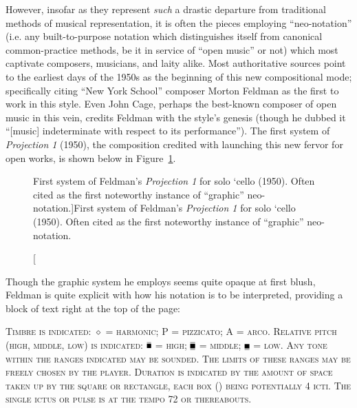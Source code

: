     However, insofar as they represent \textit{such} a drastic departure from traditional methods of musical representation, it is often the pieces employing ``neo-notation'' (i.e. any built-to-purpose notation which distinguishes itself from canonical common-practice methods, be it in service of ``open music'' or not) which most captivate composers, musicians, and laity alike. Most authoritative sources point to the earliest days of the 1950s as the beginning of this new compositional mode; specifically citing ``New York School'' composer Morton Feldman as the first to work in this style. Even John Cage, perhaps the best-known composer of open music in this vein, credits Feldman with the style's genesis (though he dubbed it ``[music] indeterminate with respect to its performance'').\autocite{Dohoney_2017} The first system of \textit{Projection 1} (1950), the composition credited with launching this new fervor for open works, is shown below in Figure~\ref{fig:feldman1}.

        \begin{figure}
            \centering
            \captionsetup{width=.5\textwidth}
            \caption[First system of Feldman's \textit{Projection 1} for solo `cello (1950). Often cited as the first noteworthy instance of ``graphic'' neo-notation.]{First system of Feldman's \textit{Projection 1} for solo `cello (1950). Often cited as the first noteworthy instance of ``graphic'' neo-notation.\footnotemark}
            \label{fig:feldman1}
        \end{figure}

    Though the graphic system he employs seems quite opaque at first blush, Feldman is quite explicit with how his notation is to be interpreted, providing a block of text right at the top of the page:

        \begin{smallquote}
            \textsc{Timbre is indicated: $\diamond$ = harmonic; P = pizzicato; A = arco. Relative pitch (high, middle, low) is indicated: $\overline{\rule{1.2ex}{1.2ex}}$ = high; $\overline{\underline{\rule{1.2ex}{1.2ex}}}$ = middle; $\underline{\rule{1.2ex}{1.2ex}}$ = low. Any tone within the ranges indicated may be sounded. The limits of these ranges may be freely chosen by the player. Duration is indicated by the amount of space taken up by the square or rectangle, each box (\myline[dashed]  \myline[dashed]) being potentially 4 icti. The single ictus or pulse is at the tempo 72 or thereabouts.\autocite{Feldman_2002}}
        \end{smallquote}


